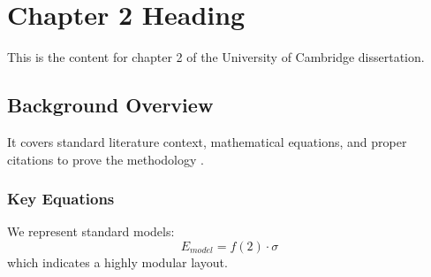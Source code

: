 \chapter{Chapter 2 Heading}
\label{ch:chapter2}
This is the content for chapter 2 of the University of Cambridge dissertation.

\section{Background Overview}
It covers standard literature context, mathematical equations, and proper citations to prove the methodology \cite{texbook}.

\subsection{Key Equations}
We represent standard models:
\begin{equation}
    E_{model} = f(2) \cdot \sigma
\end{equation}
which indicates a highly modular layout.
